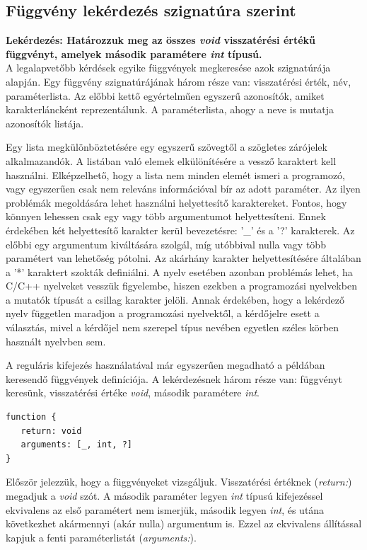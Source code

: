 \documentclass[a4paper,12pt]{report}
\begin{document}
\subsection{Függvény lekérdezés szignatúra szerint}
\textbf{Lekérdezés: Határozzuk meg az összes \textit{void} visszatérési értékű függvényt, amelyek második paramétere \textit{int} típusú.}
\\
A legalapvetőbb kérdések egyike függvények megkeresése azok szignatúrája alapján. Egy függvény szignatúrájának három része van: visszatérési érték, név, paraméterlista. Az előbbi kettő egyértelműen egyszerű azonosítók, amiket karakterláncként reprezentálunk. A paraméterlista, ahogy a neve is mutatja azonosítók listája.
\par Egy lista megkülönböztetésére egy egyszerű szövegtől a szögletes zárójelek alkalmazandók. A listában való elemek elkülönítésére a vessző karaktert kell használni. Elképzelhető, hogy a lista nem minden elemét ismeri a programozó, vagy egyszerűen csak nem releváns információval bír az adott paraméter. Az ilyen problémák megoldására lehet használni helyettesítő karaktereket. Fontos, hogy könnyen lehessen csak egy vagy több argumentumot helyettesíteni. Ennek érdekében két helyettesítő karakter kerül bevezetésre: '\_' és a '?' karakterek. Az előbbi egy argumentum kiváltására szolgál, míg utóbbival nulla vagy több paramétert van lehetőség pótolni. Az akárhány karakter helyettesítésére általában a '*' karaktert szokták definiálni. A nyelv esetében azonban problémás lehet, ha C/C++ nyelveket vesszük figyelembe, hiszen ezekben a programozási nyelvekben a mutatók típusát a csillag karakter jelöli. Annak érdekében, hogy a lekérdező nyelv független maradjon a programozási nyelvektől, a kérdőjelre esett a választás, mivel a kérdőjel nem szerepel típus nevében egyetlen széles körben használt nyelvben sem.
\par A reguláris kifejezés használatával már egyszerűen megadható a példában keresendő függvények definíciója. A lekérdezésnek három része van: függvényt keresünk, visszatérési értéke \textit{void}, második paramétere \textit{int}.
\begin{verbatim}
function {
   return: void
   arguments: [_, int, ?]
}
\end{verbatim}
\par Először jelezzük, hogy a függvényeket vizsgáljuk. Visszatérési értéknek (\textit{return:}) megadjuk a \textit{void} szót. A második paraméter legyen \textit{int} típusú kifejezéssel ekvivalens az első paramétert nem ismerjük, második legyen \textit{int}, és utána következhet akármennyi (akár nulla) argumentum is. Ezzel az ekvivalens állítással kapjuk a fenti paraméterlistát (\textit{arguments:}).
\end{document}
